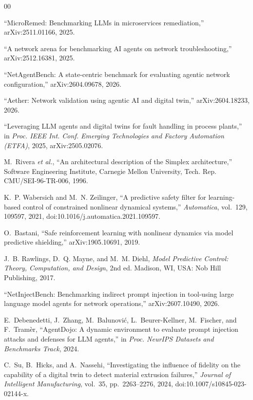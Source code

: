 \documentclass[conference]{IEEEtran}
\begin{document}
\begin{thebibliography}{00}

 ``MicroRemed: Benchmarking LLMs in microservices remediation,'' arXiv:2511.01166, 2025.

 ``A network arena for benchmarking AI agents on network troubleshooting,'' arXiv:2512.16381, 2025.

 ``NetAgentBench: A state-centric benchmark for evaluating agentic network configuration,'' arXiv:2604.09678, 2026.

 ``Aether: Network validation using agentic AI and digital twin,'' arXiv:2604.18233, 2026.

 ``Leveraging LLM agents and digital twins for fault handling in process plants,'' in \emph{Proc. IEEE Int. Conf. Emerging Technologies and Factory Automation (ETFA)}, 2025, arXiv:2505.02076.

 M.~Rivera \emph{et al.}, ``An architectural description of the Simplex architecture,'' Software Engineering Institute, Carnegie Mellon University, Tech. Rep. CMU/SEI-96-TR-006, 1996.

 K.~P. Wabersich and M.~N. Zeilinger, ``A predictive safety filter for learning-based control of constrained nonlinear dynamical systems,'' \emph{Automatica}, vol.~129, 109597, 2021, doi:10.1016/j.automatica.2021.109597.

 O.~Bastani, ``Safe reinforcement learning with nonlinear dynamics via model predictive shielding,'' arXiv:1905.10691, 2019.

 J.~B. Rawlings, D.~Q. Mayne, and M.~M. Diehl, \emph{Model Predictive Control: Theory, Computation, and Design}, 2nd ed. Madison, WI, USA: Nob Hill Publishing, 2017.

 ``NetInjectBench: Benchmarking indirect prompt injection in tool-using large language model agents for network operations,'' arXiv:2607.10490, 2026.

 E.~Debenedetti, J.~Zhang, M.~Balunovi\'c, L.~Beurer-Kellner, M.~Fischer, and F.~Tram\`er, ``AgentDojo: A dynamic environment to evaluate prompt injection attacks and defenses for LLM agents,'' in \emph{Proc. NeurIPS Datasets and Benchmarks Track}, 2024.

 C.~Su, B.~Hicks, and A.~Nassehi, ``Investigating the influence of fidelity on the capability of a digital twin to detect material extrusion failures,'' \emph{Journal of Intelligent Manufacturing}, vol.~35, pp.~2263--2276, 2024, doi:10.1007/s10845-023-02144-x.


\end{thebibliography}
\end{document}

